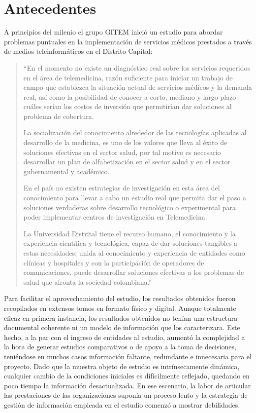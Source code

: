 \chapter{Antecedentes}

A principios del milenio el grupo GITEM inició un estudio para abordar problemas puntuales en la implementación de servicios médicos prestados a través de medios teleinformáticos en el Distrito Capital\cite{aparicio2000}:

\begin{quote}
“En el momento no existe un diagnóstico real sobre los servicios requeridos en el área de telemedicina, razón suficiente para iniciar un trabajo de campo que establezca la situación actual de servicios médicos y la demanda real, así como la posibilidad de conocer a corto, mediano y largo plazo cuáles serían los costos de inversión que permitirían dar soluciones al problema  de cobertura.

La socialización del conocimiento alrededor de las tecnologías aplicadas al desarrollo de la medicina, es uno de los valores que lleva al éxito de soluciones efectivas en el sector salud, por tal motivo es necesario desarrollar un plan de alfabetización en el sector salud y en el sector gubernamental y académico.

En el país no existen estrategias de investigación en esta área del conocimiento para llevar a cabo un estudio real que permita dar el paso a soluciones verdaderas sobre desarrollo tecnológico o experimental para poder implementar centros de investigación en Telemedicina.

La Universidad Distrital tiene el recurso humano, el conocimiento y la experiencia científica y tecnológica, capaz de dar soluciones tangibles a estas necesidades; unida al conocimiento y experiencia de entidades como clínicas y hospitales  y con la participación de operadores de comunicaciones, puede desarrollar soluciones efectivas a los problemas de salud que afronta la sociedad colombiana.”
\end{quote}

Para facilitar el aprovechamiento del estudio, los resultados obtenidos fueron recopilados en extensos tomos en formato físico y digital. Aunque totalmente eficaz en primera instancia, los resultados obtenidos no tenían una estructura documental coherente ni un modelo de información que los caracterizara. Este hecho, a la par con el ingreso de entidades al estudio, aumentó la complejidad a la hora de generar estudios comparativos o de apoyo a la toma de decisiones, teniéndose en muchos casos información faltante, redundante e innecesaria para el proyecto. Dado que la muestra objeto de estudio es intrínsecamente  dinámica, cualquier cambio de la condiciones iniciales es difícilmente reflejado, quedando en poco tiempo la información desactualizada. En ese escenario, la labor de articular las prestaciones de las organizaciones suponía un proceso lento y la estrategia de gestión de información empleada en el estudio comenzó a mostrar debilidades.

